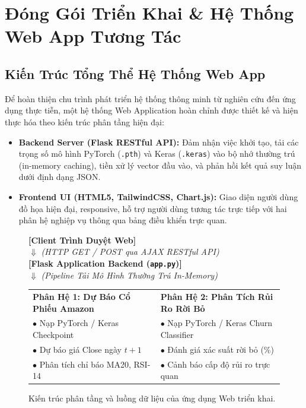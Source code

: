 \documentclass[12pt,a4paper]{report}
\begin{document}
\newpage

\chapter{Đóng Gói Triển Khai \& Hệ Thống Web App Tương Tác}

\section{Kiến Trúc Tổng Thể Hệ Thống Web App}
Để hoàn thiện chu trình phát triển hệ thống thông minh từ nghiên cứu đến ứng dụng thực tiễn, một hệ thống Web Application hoàn chỉnh được thiết kế và hiện thực hóa theo kiến trúc phân tầng hiện đại:
\begin{itemize}
    \item \textbf{Backend Server (Flask RESTful API):} Đảm nhận việc khởi tạo, tải các trọng số mô hình PyTorch (\texttt{.pth}) và Keras (\texttt{.keras}) vào bộ nhớ thường trú (in-memory caching), tiền xử lý vector đầu vào, và phản hồi kết quả suy luận dưới định dạng JSON.
    \item \textbf{Frontend UI (HTML5, TailwindCSS, Chart.js):} Giao diện người dùng đồ họa hiện đại, responsive, hỗ trợ người dùng tương tác trực tiếp với hai phân hệ nghiệp vụ thông qua bảng điều khiển trực quan.
\end{itemize}

\begin{figure}[H]
    \centering
    \begin{tcolorbox}[colback=blue!5!white,colframe=blue!75!black,title=\textbf{Sơ Đồ Kiến Trúc Triển Khai Hệ Thống Web (Port 8080)}]
        \centering
        \textbf{[Client Trình Duyệt Web]}\\[0.15cm]
        $\Downarrow$ \textit{(HTTP GET / POST qua AJAX RESTful API)}\\[0.15cm]
        \textbf{[Flask Application Backend (\texttt{app.py})]}\\[0.15cm]
        $\Downarrow$ \textit{(Pipeline Tải Mô Hình Thường Trú In-Memory)}\\[0.25cm]
        \begin{tabular}{p{6.8cm} p{6.8cm}}
            \textbf{Phân Hệ 1: Dự Báo Cổ Phiếu Amazon} & \textbf{Phân Hệ 2: Phân Tích Rủi Ro Rời Bỏ} \\
            $\bullet$ Nạp PyTorch / Keras Checkpoint & $\bullet$ Nạp PyTorch / Keras Churn Classifier \\
            $\bullet$ Dự báo giá Close ngày $t+1$ & $\bullet$ Đánh giá xác suất rời bỏ (\%) \\
            $\bullet$ Phân tích chỉ báo MA20, RSI-14 & $\bullet$ Cảnh báo cấp độ rủi ro trực quan \\
        \end{tabular}
    \end{tcolorbox}
    \caption{Kiến trúc phân tầng và luồng dữ liệu của ứng dụng Web triển khai.}
    \label{fig:web_arch}
\end{figure}
\end{document}
